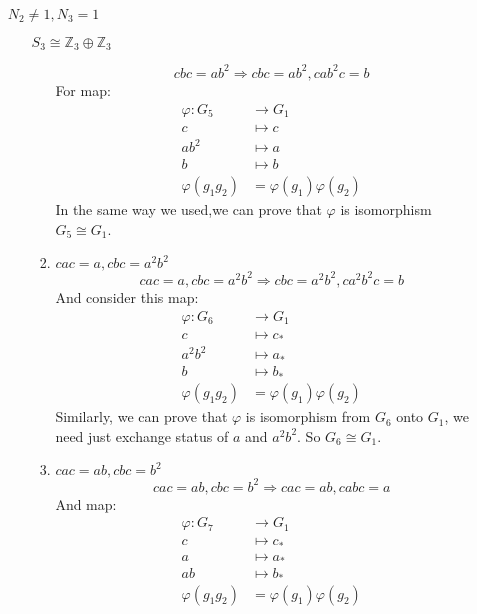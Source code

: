 \documentclass[a4paper,14pt]{article}
\begin{document}
\begin{enumerate}
\begin{item}{$N_2 \neq 1, N_3 = 1$}
\begin{enumerate}
\begin{item}{$S_3\cong \mathbb{Z}_3 \oplus \mathbb{Z}_3$}
\begin{enumerate}
                            $$cbc=ab^2 \Rightarrow cbc=ab^2,cab^2c=b$$
                            For map:
                            \begin{align*}
                                \varphi:G_5 &\to G_1\\
                                c &\longmapsto c\\
                                ab^2 &\longmapsto a\\
                                b &\longmapsto b\\
                                \varphi(g_1g_2) &= \varphi(g_1)\varphi(g_2)
                            \end{align*}
                            In the same way we used,we can prove that $\varphi$ is isomorphism $G_5 \cong G_1$.
                        \item $cac=a,cbc=a^2b^2$
                            $$cac=a,cbc=a^2b^2 \Rightarrow cbc = a^2b^2, ca^2b^2c=b$$
                            And consider this map:
                            \begin{align*}
                                \varphi:G_6 &\to G_1\\
                                c &\longmapsto c_*\\
                                a^2b^2 &\longmapsto a_*\\
                                b &\longmapsto b_*\\
                                \varphi(g_1g_2) &= \varphi(g_1)\varphi(g_2)
                            \end{align*}
                            Similarly, we can prove that $\varphi$ is isomorphism from $G_6$ onto $G_1$, we need just exchange status of $a$ and $a^2b^2$.
                            So $G_6 \cong G_1$.
                        \item $cac=ab, cbc=b^2$
                            $$cac=ab, cbc=b^2 \Rightarrow cac=ab, cabc=a$$
                            And map:
                            \begin{align*}
                                \varphi:G_7 &\to G_1\\
                                c &\longmapsto c_*\\
                                a &\longmapsto a_*\\
                                ab &\longmapsto b_*\\
                                \varphi(g_1g_2) &= \varphi(g_1)\varphi(g_2)

\end{align*}
\end{enumerate}
\end{item}
\end{enumerate}
\end{item}
\end{enumerate}
\end{document}

